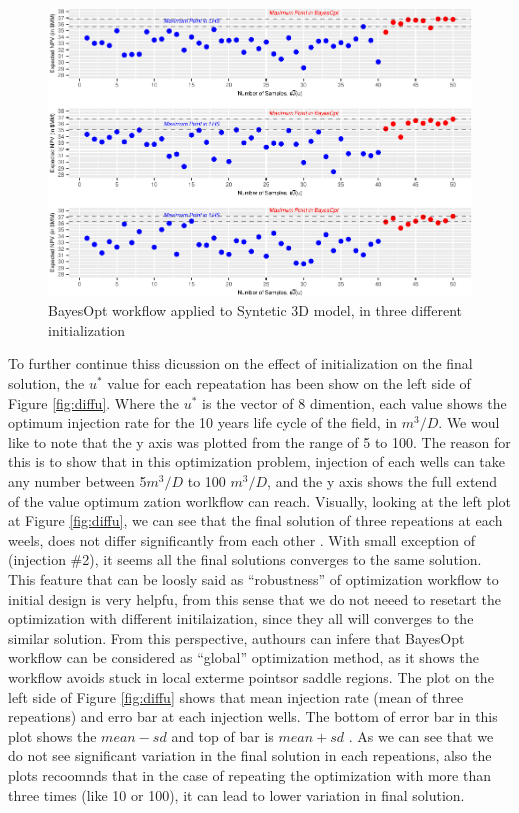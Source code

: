 \documentclass[]{elsarticle} %
\begin{document}
\begin{eqution}
\begin{figure}
{\centering \includegraphics[width=0.9\linewidth,height=0.9\textheight]{0_Paper1_main_files/figure-latex/difinit-1} 

}

\caption{BayesOpt workflow applied to Syntetic 3D model, in three different initialization}\label{fig:difinit}
\end{figure}

To further continue thiss dicussion on the effect of initialization on the final solution, the \(u^*\) value for each repeatation has been show on the left side of Figure \ref{fig:diffu}. Where the \(u^*\) is the vector of 8 dimention, each value shows the optimum injection rate for the 10 years life cycle of the field, in \(m^3/D\). We woul like to note that the y axis was plotted from the range of 5 to 100. The reason for this is to show that in this optimization problem, injection of each wells can take any number between 5\(m^3/D\) to 100 \(m^3/D\), and the y axis shows the full extend of the value optimum zation worlkflow can reach. Visually, looking at the left plot at Figure \ref{fig:diffu}, we can see that the final solution of three repeations at each weels, does not differ significantly from each other . With small exception of (injection \#2), it seems all the final solutions converges to the same solution. This feature that can be loosly said as ``robustness'' of optimization workflow to initial design is very helpfu, from this sense that we do not neeed to resetart the optimization with different initilaization, since they all will converges to the similar solution. From this perspective, authours can infere that BayesOpt workflow can be considered as ``global'' optimization method, as it shows the workflow avoids stuck in local exterme pointsor saddle regions. The plot on the left side of Figure \ref{fig:diffu} shows that mean injection rate (mean of three repeations) and erro bar at each injection wells. The bottom of error bar in this plot shows the \(mean-sd\) and top of bar is \(mean + sd\) . As we can see that we do not see significant variation in the final solution in each repeations, also the plots recoomnds that in the case of repeating the optimization with more than three times (like 10 or 100), it can lead to lower variation in final solution.


\end{eqution}
\end{document}
